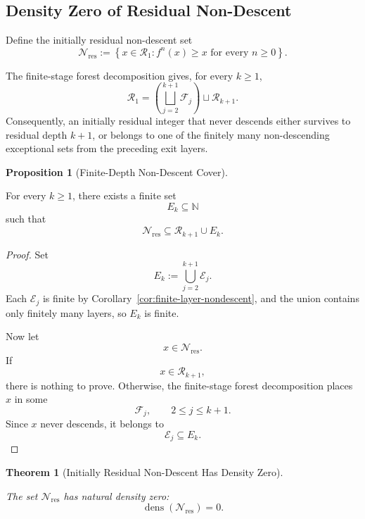 \documentclass[12pt, oneside]{article}
\numberwithin{equation}{section}
\theoremstyle{definition}
\newtheorem{proposition}{Proposition}[section]
\theoremstyle{plain}
\newtheorem{theorem}{Theorem}[section]
\theoremstyle{remark}
\begin{document}
\subsection{Density Zero of Residual Non-Descent}

Define the initially residual non-descent set
\[
\mathcal N_{\mathrm{res}}
:=
\left\{
x\in\mathcal R_1:
f^n(x)\ge x
\text{ for every }n\ge0
\right\}.
\]

The finite-stage forest decomposition gives, for every \(k\ge1\),
\[
\mathcal R_1
=
\left(
\bigsqcup_{j=2}^{k+1}\mathcal F_j
\right)
\sqcup
\mathcal R_{k+1}.
\]
Consequently, an initially residual integer that never descends either
survives to residual depth \(k+1\), or belongs to one of the finitely many
non-descending exceptional sets from the preceding exit layers.

\begin{proposition}[Finite-Depth Non-Descent Cover]
\label{prop:finite-depth-nondescent-cover}

For every \(k\ge1\), there exists a finite set
\[
E_k\subseteq\mathbb N
\]
such that
\[
\boxed{
\mathcal N_{\mathrm{res}}
\subseteq
\mathcal R_{k+1}\cup E_k.
}
\]
\end{proposition}

\begin{proof}
Set
\[
E_k
:=
\bigcup_{j=2}^{k+1}\mathcal E_j.
\]
Each \(\mathcal E_j\) is finite by
Corollary~\ref{cor:finite-layer-nondescent}, and the union contains only
finitely many layers, so \(E_k\) is finite.

Now let
\[
x\in\mathcal N_{\mathrm{res}}.
\]
If
\[
x\in\mathcal R_{k+1},
\]
there is nothing to prove. Otherwise, the finite-stage forest decomposition
places \(x\) in some
\[
\mathcal F_j,
\qquad
2\le j\le k+1.
\]
Since \(x\) never descends, it belongs to
\[
\mathcal E_j\subseteq E_k.
\]
\end{proof}

\begin{theorem}[Initially Residual Non-Descent Has Density Zero]
\label{thm:residual-nondescent-density-zero}

The set \(\mathcal N_{\mathrm{res}}\) has natural density zero:
\[
\boxed{
\operatorname{dens}(\mathcal N_{\mathrm{res}})=0.
}
\]
\end{theorem}
\end{document}
